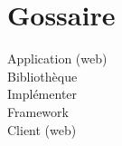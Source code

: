 \chapter{Gossaire}
	\begin{description}
		\item[Application (web)]
		\item[Bibliothèque]
		\item[Implémenter]
		\item[Framework]
		\item[Client (web)]
	\end{description}